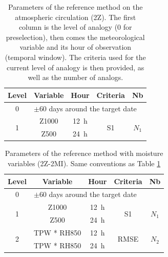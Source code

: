 \documentclass[hess, manuscript]{copernicus}
\begin{document}
\clearpage


\begin{table}[htb]
	\caption{Parameters of the reference method on the atmospheric circulation (2Z). The first column is the level of analogy (0 for preselection), then comes the meteorological variable and its hour of observation (temporal window). The criteria used for the current level of analogy is then provided, as well as the number of analogs.}
	\footnotesize
	\begin{center}
		\begin{tabular}{ccccc}
			\hline
			Level & Variable & Hour & Criteria & Nb \\ 
			\hline 
			0 & \multicolumn{4}{l}{$\pm 60$ days around the target date} \\
			\hline 
			\multirow{2}{*}{1} & Z1000 & 12~h & \multirow{2}{*}{S1} & \multirow{2}{*}{$N_{1}$} \\
			& Z500 & 24~h & & \\ 
			\hline 
		\end{tabular} 
	\end{center}
	\label{table:method_2Z}
\end{table}

\begin{table}[htb]
	\caption{Parameters of the reference method with moisture variables (2Z-2MI). Same conventions as Table \ref{table:method_2Z}}
	\footnotesize
	\begin{center}
		\begin{tabular}{ccccc}
			\hline 
			Level & Variable & Hour & Criteria & Nb \\ 
			\hline 
			0 & \multicolumn{4}{l}{$\pm 60$ days around the target date} \\
			\hline 
			\multirow{2}{*}{1} & Z1000 & 12~h & \multirow{2}{*}{S1} & \multirow{2}{*}{$N_{1}$} \\
			& Z500 & 24~h & & \\ 
			\hline
			\multirow{2}{*}{2} & TPW * RH850 & 12~h & \multirow{2}{*}{RMSE} & \multirow{2}{*}{$N_{2}$} \\
			& TPW * RH850 & 24~h & & \\ 
			\hline 
		\end{tabular} 
	\end{center}
	\label{table:method_2Z-2MI}
\end{table}
\end{document}
